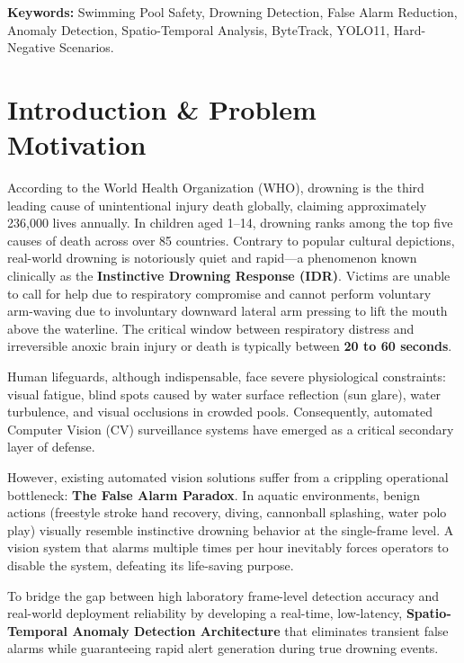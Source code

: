 \documentclass[a4paper,11pt]{article}
\begin{document}
\vspace{5pt}
\noindent \textbf{Keywords:} Swimming Pool Safety, Drowning Detection, False Alarm Reduction, Anomaly Detection, Spatio-Temporal Analysis, ByteTrack, YOLO11, Hard-Negative Scenarios.

\vspace{10pt}

\section{Introduction \& Problem Motivation}
According to the World Health Organization (WHO), drowning is the third leading cause of unintentional injury death globally, claiming approximately 236,000 lives annually. In children aged 1--14, drowning ranks among the top five causes of death across over 85 countries. Contrary to popular cultural depictions, real-world drowning is notoriously quiet and rapid—a phenomenon known clinically as the \textbf{Instinctive Drowning Response (IDR)}. Victims are unable to call for help due to respiratory compromise and cannot perform voluntary arm-waving due to involuntary downward lateral arm pressing to lift the mouth above the waterline. The critical window between respiratory distress and irreversible anoxic brain injury or death is typically between \textbf{20 to 60 seconds}.

Human lifeguards, although indispensable, face severe physiological constraints: visual fatigue, blind spots caused by water surface reflection (sun glare), water turbulence, and visual occlusions in crowded pools. Consequently, automated Computer Vision (CV) surveillance systems have emerged as a critical secondary layer of defense.

However, existing automated vision solutions suffer from a crippling operational bottleneck: \textbf{The False Alarm Paradox}. In aquatic environments, benign actions (freestyle stroke hand recovery, diving, cannonball splashing, water polo play) visually resemble instinctive drowning behavior at the single-frame level. A vision system that alarms multiple times per hour inevitably forces operators to disable the system, defeating its life-saving purpose.

\vspace{5pt}
\begin{tcolorbox}[colback=white, colframe=accentred, title=\textbf{Core Research Objective}]
To bridge the gap between high laboratory frame-level detection accuracy and real-world deployment reliability by developing a real-time, low-latency, \textbf{Spatio-Temporal Anomaly Detection Architecture} that eliminates transient false alarms while guaranteeing rapid alert generation during true drowning events.
\end{tcolorbox}
\end{document}
